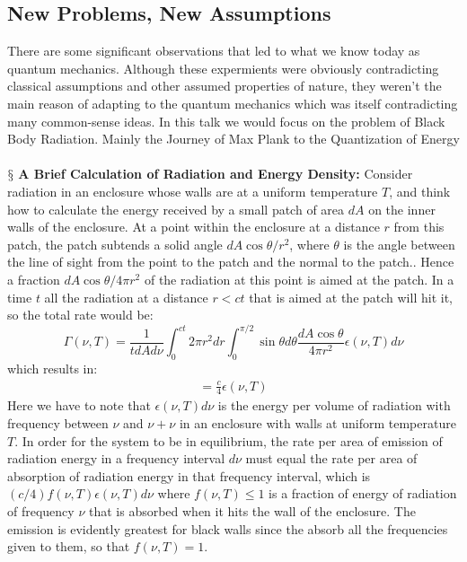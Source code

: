 \documentclass[9pt,a4paper, twocolumn]{article}
\newcommand{\newpoint}[1]{\ \\ \indent$\mathsection$ \textbf{#1}}
\begin{document}
        \subsection{New Problems, New Assumptions}
            There are some significant observations that led to what we know today as quantum mechanics. Although these expermients were obviously contradicting classical assumptions and other assumed properties of nature, they weren't the main reason of adapting to the quantum mechanics which was itself contradicting many common-sense ideas. In this talk we would focus on the problem of Black Body Radiation. Mainly the Journey of Max Plank to the Quantization of Energy
            \newpoint{A Brief Calculation of Radiation and Energy Density:}  Consider radiation in an enclosure whose walls are at a uniform temperature $T$, and think how to calculate the energy received by a small patch of area $dA$ on the inner walls of the enclosure. At a point within the enclosure at a distance $r$ from this patch, the patch subtends a solid angle $dA\cos\theta/r^2$, where $\theta$ is the angle between the line of sight from the point to the patch and the normal to the patch.. Hence a fraction $dA\cos\theta/4\pi r^2$ of the radiation at this point is aimed at the patch. In a time $t$ all the radiation at a distance $r<ct$ that is aimed at the patch will hit it, so the total rate would be:
            \begin{equation}
                \Gamma(\nu, T) = \frac{1}{tdA d\nu} \int_0^{ct}2\pi r^2 dr\int_0^{\pi/2} \sin\theta d\theta \frac{dA\cos\theta}{4\pi r^2}\epsilon (\nu, T) d\nu 
            \end{equation}
            which results in:
            \begin{align*}
                = \frac c4 \epsilon(\nu, T)
            \end{align*}
            Here we have to note that $\epsilon(\nu, T)d\nu$ is the energy per volume of radiation with frequency between $\nu$ and $\nu + \nu$ in an enclosure with walls at uniform temperature $T$. In order for the system to be in equilibrium, the rate per area of emission of radiation energy in a frequency interval $d\nu$ must equal the rate per area of absorption of radiation energy in that frequency interval, which is $(c/4)f(\nu, T)\epsilon(\nu, T)d\nu$ where $f(\nu, T)\leq 1$ is a fraction of energy of radiation of frequency $\nu$ that is absorbed when it hits the wall of the enclosure. The emission is evidently greatest for black walls since the absorb all the frequencies given to them, so that $f(\nu, T) = 1$.
\end{document}
